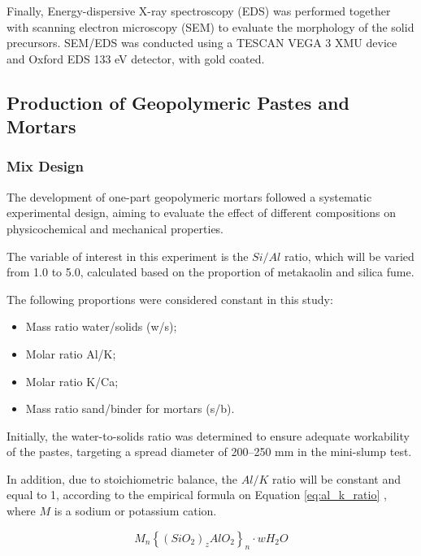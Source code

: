 Finally, Energy-dispersive X-ray spectroscopy (EDS) was performed together with scanning electron microscopy (SEM) to evaluate the morphology of the solid precursors.
SEM/EDS was conducted using a TESCAN VEGA 3 XMU device and Oxford EDS 133 eV detector, with gold coated.


\subsection{Production of Geopolymeric Pastes and Mortars}
\label{sec:production_geopolymeric_pastes_mortars}

\subsubsection{Mix Design}
\label{sec:mix_design}

The development of one-part geopolymeric mortars followed a systematic experimental design, aiming to evaluate the effect of different compositions on physicochemical and mechanical properties.

The variable of interest in this experiment is the $Si/Al$ ratio, which will be varied from 1.0 to 5.0, calculated based on the proportion of metakaolin and silica fume.

The following proportions were considered constant in this study:

\begin{itemize}
    \item Mass ratio water/solids (w/s);
    \item Molar ratio Al/K;
    \item Molar ratio K/Ca;
    \item Mass ratio sand/binder for mortars (s/b).
\end{itemize}

Initially, the water-to-solids ratio was determined to ensure adequate workability of the pastes, targeting a spread diameter of 200–250 mm in the mini-slump test.

In addition, due to stoichiometric balance, the $Al/K$ ratio will be constant and equal to 1, according to the empirical formula on Equation \ref{eq:al_k_ratio} \cite{joseph1991geopolymers}, where $M$ is a sodium or potassium cation.

\begin{equation}
    \label{eq:al_k_ratio}
    M_n \left\{ \left(SiO_2 \right)_z AlO_2 \right\}_n \cdot wH_2O
\end{equation}

